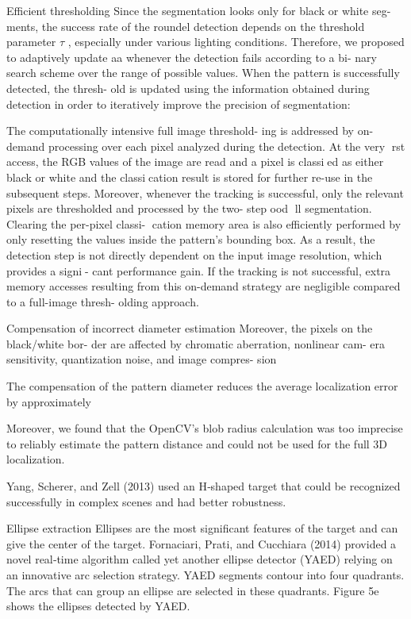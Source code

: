 \documentclass[a4paper]{report}
\begin{document}
Efficient thresholding
Since the segmentation looks only for black or white seg-
ments, the success rate of the roundel detection depends
on the threshold parameter $\tau$ , especially under various
lighting conditions. Therefore, we proposed to adaptively
update aa whenever the detection fails according to a bi-
nary search scheme over the range of possible values.
When the pattern is successfully detected, the thresh-
old is updated using the information obtained during
detection in order to iteratively improve the precision of segmentation:

The computationally intensive full image threshold-
ing is addressed by on-demand processing over each pixel
analyzed during the detection. At the very rst access,
the RGB values of the image are read and a pixel is
classied as either black or white and the classication
result is stored for further re-use in the subsequent steps.
Moreover, whenever the tracking is successful, only the
relevant pixels are thresholded and processed by the two-
step 
ood ll segmentation. Clearing the per-pixel classi-
cation memory area is also efficiently performed by only
resetting the values inside the pattern's bounding box.
As a result, the detection step is not directly dependent
on the input image resolution, which provides a signi-
cant performance gain. If the tracking is not successful,
extra memory accesses resulting from this on-demand
strategy are negligible compared to a full-image thresh-
olding approach.

Compensation of incorrect diameter estimation
Moreover, the pixels on the black/white bor-
der are affected by chromatic aberration, nonlinear cam-
era sensitivity, quantization noise, and image compres-
sion

The compensation of the
pattern diameter reduces the average localization error
by approximately

Moreover,
we found that the OpenCV's blob radius calculation was
too imprecise to reliably estimate the pattern distance
and could not be used for the full 3D localization.


 Yang,
Scherer, and Zell (2013) used an H‐shaped target that could be
recognized successfully in complex scenes and had better robustness.

Ellipse extraction
Ellipses are the most significant features of the target and can give the
center of the target. Fornaciari, Prati, and Cucchiara (2014) provided a
novel real‐time algorithm called yet another ellipse detector (YAED)
relying on an innovative arc selection strategy. YAED segments contour
into four quadrants. The arcs that can group an ellipse are selected in
these quadrants. Figure 5e shows the ellipses detected by YAED.

 

\end{document}
